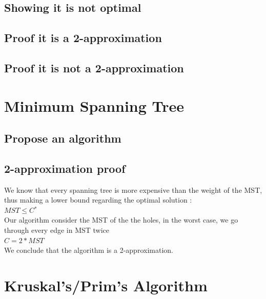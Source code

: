 \documentclass{article}
\begin{document}
\subsection{Showing it is not optimal}
\subsection{Proof it is a 2-approximation}
\subsection{Proof it is not a 2-approximation}

\section{Minimum Spanning Tree}

\subsection{Propose an algorithm}

\subsection{2-approximation proof}
We know that every spanning tree is more expensive than the weight of the MST, thus making a lower bound regarding the optimal solution :\\
$MST \leq C{^*}$ \\
Our algorithm consider the MST of the the holes, in the worst case, we go through every edge in MST twice\\
$C = 2 * MST$ \\ 
We conclude that the algorithm is a 2-approximation.

\section{Kruskal's/Prim's Algorithm}
\end{document}
